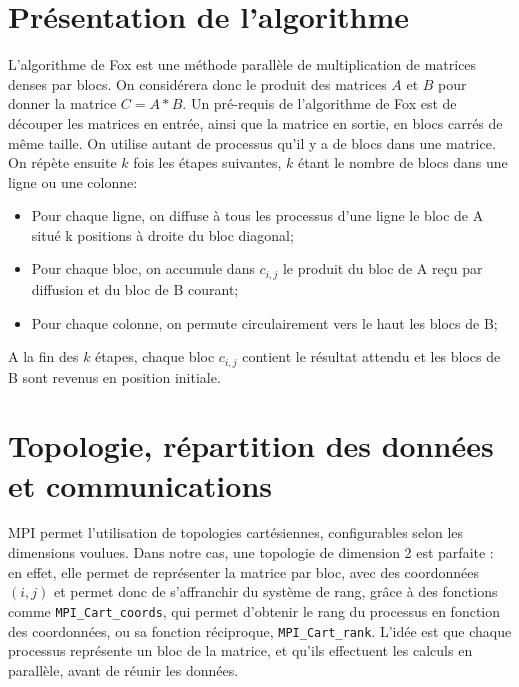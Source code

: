 \documentclass[a4paper,11pt]{article}
\begin{document}
\section{Présentation de l'algorithme}
L'algorithme de Fox est une méthode parallèle de multiplication de matrices denses par blocs. On considérera donc le produit des matrices $A$ et $B$ pour donner la matrice $C=A*B$.
Un pré-requis de l'algorithme de Fox est de découper les matrices en entrée, ainsi que la matrice en sortie, en blocs carrés de même taille. On utilise autant de processus qu'il y a de blocs dans une matrice.
On répète ensuite $k$ fois les étapes suivantes, $k$ étant le nombre de blocs dans une ligne ou une colonne:
\begin{itemize}
\item Pour chaque ligne, on diffuse à tous les processus d'une ligne le bloc de A situé k positions à droite du bloc diagonal;
\item Pour chaque bloc, on accumule dans $c_{i,j}$ le produit du bloc de A reçu par diffusion et du bloc de B courant;  
\item Pour chaque colonne, on permute circulairement vers le haut les blocs de B;
\end{itemize}

A la fin des $k$ étapes, chaque bloc $c_{i,j}$ contient le résultat attendu et les blocs de B sont revenus en position initiale.


\section{Topologie, répartition des données et communications}
MPI permet l'utilisation de topologies cartésiennes, configurables selon les dimensions voulues. Dans notre cas, une topologie de dimension 2 est parfaite : en effet, elle permet de représenter la matrice par bloc, avec des coordonnées $(i,j)$ et permet donc de s'affranchir du système de rang, grâce à des fonctions comme \texttt{MPI\_Cart\_coords}, qui permet d'obtenir le rang du processus en fonction des coordonnées, ou sa fonction réciproque, \texttt{MPI\_Cart\_rank}.
L'idée est que chaque processus représente un bloc de la matrice, et qu'ils effectuent les calculs en parallèle, avant de réunir les données.
\end{document}
